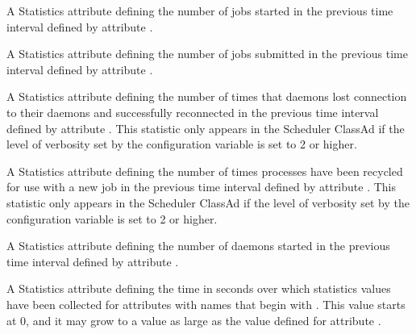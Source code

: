 \begin{description}
\item[\AdAttr{RecentJobsStarted}:] A Statistics attribute defining
  the number of jobs started
  in the previous time interval defined by attribute .

\item[\AdAttr{RecentJobsSubmitted}:] A Statistics attribute defining
  the number of jobs submitted
  in the previous time interval defined by attribute .

\item[\AdAttr{RecentShadowsReconnections}:] A Statistics attribute defining
  the number of times that   daemons lost 
  connection to their  daemons and successfully reconnected
  in the previous time interval defined by attribute .
  This statistic only appears in the Scheduler ClassAd if the level of
  verbosity set by the configuration variable 
  is set to 2 or higher.
  
\item[\AdAttr{RecentShadowsRecycled}:] A Statistics attribute defining
  the number of times  
  processes have been recycled for use with a new job
  in the previous time interval defined by attribute .
  This statistic only appears in the Scheduler ClassAd if the level of
  verbosity set by the configuration variable 
  is set to 2 or higher.

\item[\AdAttr{RecentShadowsStarted}:] A Statistics attribute defining
  the number of  daemons started
  in the previous time interval defined by attribute .

\item[\AdAttr{RecentStatsLifetime}:] A Statistics attribute defining
  the time in seconds over which statistics values have been collected 
  for attributes with names that begin with .
  This value starts at 0, and it may grow to a value as large as
  the value defined for attribute . 


\end{description}
